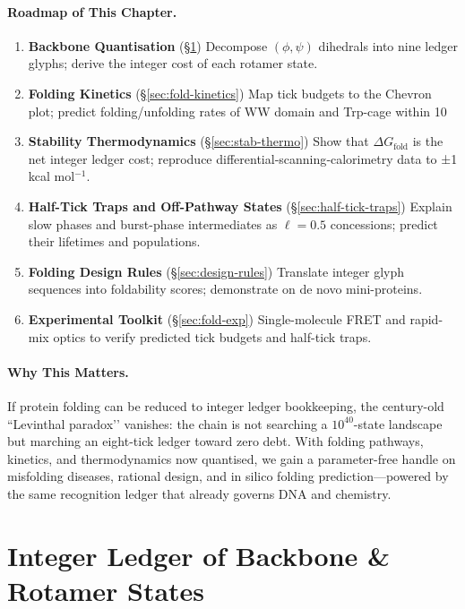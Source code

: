 \documentclass[11pt,oneside]{book}
\begin{document}
\paragraph{Roadmap of This Chapter.}
\begin{enumerate}[label=\textbf{\arabic*.}, leftmargin=1.2cm]
\item \textbf{Backbone Quantisation} (\S\ref{sec:backbone-quant})  
      Decompose \((\phi,\psi)\) dihedrals into nine ledger glyphs;
      derive the integer cost of each rotamer state.
\item \textbf{Folding Kinetics} (\S\ref{sec:fold-kinetics})  
      Map tick budgets to the Chevron plot; predict folding/unfolding
      rates of WW domain and Trp-cage within 10 %
\item \textbf{Stability Thermodynamics} (\S\ref{sec:stab-thermo})  
      Show that \(\Delta G_{\text{fold}}\) is the net integer ledger
      cost; reproduce differential‐scanning‐calorimetry data to
      ±1 kcal mol\(^{-1}\).
\item \textbf{Half-Tick Traps and Off-Pathway States} (\S\ref{sec:half-tick-traps})  
      Explain slow phases and burst-phase intermediates as
      \(\ell=0.5\) concessions; predict their lifetimes and populations.
\item \textbf{Folding Design Rules} (\S\ref{sec:design-rules})  
      Translate integer glyph sequences into foldability scores;
      demonstrate on de novo mini-proteins.
\item \textbf{Experimental Toolkit} (\S\ref{sec:fold-exp})  
      Single-molecule FRET and rapid-mix optics to verify predicted
      tick budgets and half-tick traps.
\end{enumerate}

\paragraph{Why This Matters.}
If protein folding can be reduced to integer ledger bookkeeping, the
century-old “Levinthal paradox’’ vanishes:  
the chain is not searching a \(10^{40}\)-state landscape but marching an
eight-tick ledger toward zero debt.
With folding pathways, kinetics, and thermodynamics now quantised, we
gain a parameter-free handle on misfolding diseases, rational design,
and in silico folding prediction—powered by the same recognition
ledger that already governs DNA and chemistry.

\bigskip

\section{Integer Ledger of Backbone \& Rotamer States}
\label{sec:backbone-quant}
\end{document}
